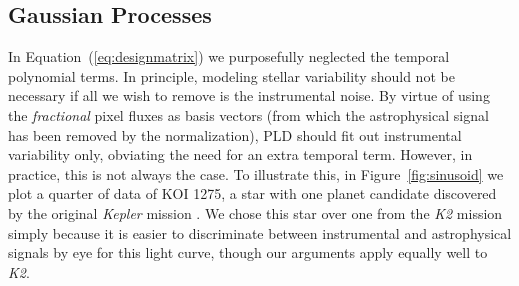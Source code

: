\documentclass[]{emulateapj}
\begin{document}
\subsection{Gaussian Processes}
\label{sec:gp}
\begin{figure*}[t]
  \begin{center}
    \leavevmode
       \caption{Different de-trending techniques for quarter 4 of KIC 8583696 (KOI 1275),
                a planet candidate host from the original \emph{Kepler} mission. The original
                data are shown in the left column; in the other columns we
                artificially injected a sinusoidal signal with a period
                of 25 days and an amplitude comparable to that of the instrumental variability.
                The top row shows the raw SAP data (black) and the first order
                PLD model (red); the residuals of the fit are indicated directly below. 
                The third row shows the final residuals after smoothing 
                with a GP to eliminate low-frequency stellar variability. Finally, the bottom
                row shows these residuals folded on the orbital period of the planet
                candidate (black), with the 5-hr median indicated in red. Combining PLD with a GP
                ensures PLD fits out only the instrumental variability without inflating the white noise.
                }
     \label{fig:sinusoid}
  \end{center}
\end{figure*}

In Equation~(\ref{eq:designmatrix}) we purposefully neglected the temporal polynomial
terms. In principle, modeling stellar variability should not be necessary if all we wish 
to remove is the instrumental noise. By virtue of using the
\emph{fractional} pixel fluxes as basis vectors (from which the astrophysical signal
has been removed by the normalization), PLD should fit out instrumental variability only,
obviating the need for an extra temporal term. However, in practice, this is not always
the case. To illustrate this, in Figure~\ref{fig:sinusoid} we plot a quarter of data
of KOI 1275, a star with one planet candidate discovered by the original \emph{Kepler}
mission \citep{BOR11}. We chose this star over one from the \emph{K2}
mission simply because it is easier to discriminate between instrumental and
astrophysical signals by eye for this light curve, though our arguments apply
equally well to \emph{K2}.
\end{document}
